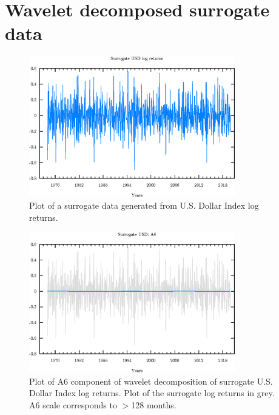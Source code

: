 \appendix
\newpage
\section{Wavelet decomposed surrogate data} \label{appendix:wavelet-surrogate}

\begin{figure}[h]
\begin{center}
\includegraphics[width=0.8\textwidth]{./code/plot/surrogate_dollar_logret.eps}
\caption{Plot of a surrogate data generated from U.S. Dollar Index log returns.}
\label{fig:s-usd-logret}
\end{center}
\end{figure}

\begin{figure}
\begin{center}
\includegraphics[width=0.8\textwidth]{./code/plot/surrogate_usd_wr_A6.eps}
\caption{Plot of A6 component of wavelet decomposition of surrogate U.S. Dollar Index log returns. 
	Plot of the surrogate log returns in grey. A6 scale corresponds to $>$128 months.}
\end{center}
\label{fig:s-usd-wr-a6}
\end{figure}


